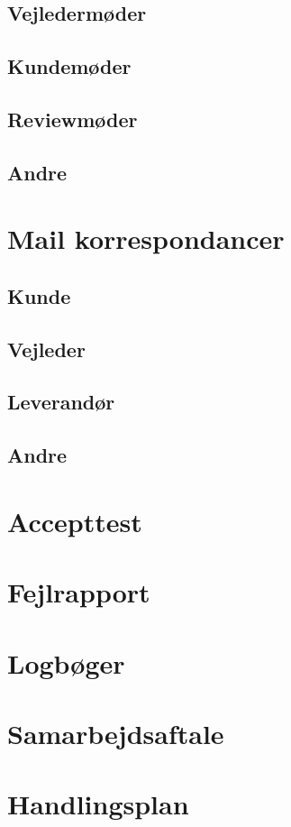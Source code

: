 \subsection{Vejledermøder}
\label{modevejleder}

\subsection{Kundemøder}
\label{modekunde}

\subsection{Reviewmøder}
\label{moderefreview}

\subsection{Andre}
\label{moderefAndre}

\section{Mail korrespondancer}
\label{mails}

\subsection{Kunde}
\label{mailKunde}

\subsection{Vejleder}
\label{mailvejleder}

\subsection{Leverandør}
\label{mailleverandor}

\subsection{Andre}
\label{mailAndre}

\section{Accepttest}
\label{bilag:Accepttest}

\section{Fejlrapport}
\label{bilag:Fejlrapport}

\section{Logbøger}
\label{bilag:Logboger}

\section{Samarbejdsaftale}
\label{bilag:samarbejdsaftale}

\section{Handlingsplan}
\label{bilag:Handlingsplan}